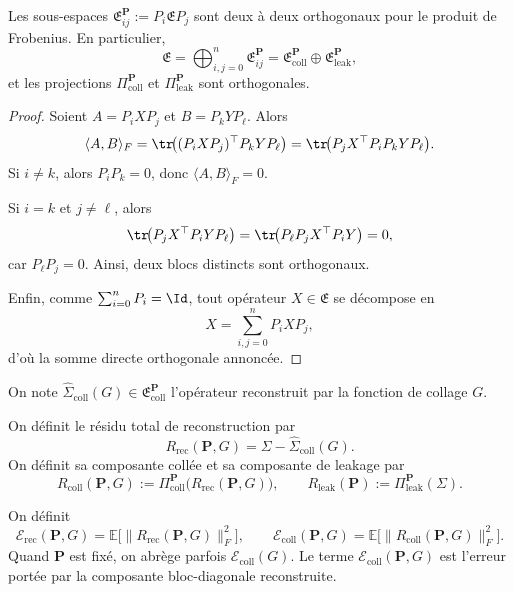 \begin{lemma}
Les sous-espaces \(\mathfrak E_{ij}^{\mathbf P}:=P_i\mathfrak E P_j\) sont deux à deux orthogonaux pour le produit de Frobenius.
En particulier,
\[
\mathfrak E
=
\bigoplus_{i,j=0}^n \mathfrak E_{ij}^{\mathbf P}
=
\mathfrak E_{\mathrm{coll}}^{\mathbf P}\oplus \mathfrak E_{\mathrm{leak}}^{\mathbf P},
\]
et les projections \(\Pi_{\mathrm{coll}}^{\mathbf P}\) et \(\Pi_{\mathrm{leak}}^{\mathbf P}\) sont orthogonales.
\end{lemma}

\begin{proof}
Soient \(A=P_iXP_j\) et \(B=P_kYP_\ell\). Alors
\[
\langle A,B\rangle_F
=
\tr\!\bigl((P_iXP_j)^\top P_kYP_\ell\bigr)
=
\tr\!\bigl(P_jX^\top P_iP_kYP_\ell\bigr).
\]
Si \(i\neq k\), alors \(P_iP_k=0\), donc \(\langle A,B\rangle_F=0\).

Si \(i=k\) et \(j\neq \ell\), alors
\[
\tr\!\bigl(P_jX^\top P_iYP_\ell\bigr)
=
\tr\!\bigl(P_\ell P_jX^\top P_iY\bigr)=0,
\]
car \(P_\ell P_j=0\). Ainsi, deux blocs distincts sont orthogonaux.

Enfin, comme \(\sum_{i=0}^n P_i=\Id\), tout opérateur \(X\in\mathfrak E\) se décompose en
\[
X=\sum_{i,j=0}^n P_iXP_j,
\]
d'où la somme directe orthogonale annoncée.
\end{proof}

\begin{definition}
On note \(\widehat \Sigma_{\mathrm{coll}}(G)\in\mathfrak E_{\mathrm{coll}}^{\mathbf P}\) l'opérateur reconstruit par la fonction de collage \(G\).

On définit le résidu total de reconstruction par
\[
R_{\mathrm{rec}}(\mathbf P,G)
=
\Sigma-\widehat \Sigma_{\mathrm{coll}}(G).
\]
On définit sa composante collée et sa composante de leakage par
\[
R_{\mathrm{coll}}(\mathbf P,G)
:=
\Pi_{\mathrm{coll}}^{\mathbf P}\!\bigl(R_{\mathrm{rec}}(\mathbf P,G)\bigr),
\qquad
R_{\mathrm{leak}}(\mathbf P)
:=
\Pi_{\mathrm{leak}}^{\mathbf P}(\Sigma).
\]
\end{definition}

\begin{definition}
On définit
\[
\mathcal E_{\mathrm{rec}}(\mathbf P,G)
=
\mathbb E\bigl[\|R_{\mathrm{rec}}(\mathbf P,G)\|_F^2\bigr],
\qquad
\mathcal E_{\mathrm{coll}}(\mathbf P,G)
=
\mathbb E\bigl[\|R_{\mathrm{coll}}(\mathbf P,G)\|_F^2\bigr].
\]
Quand \(\mathbf P\) est fixé, on abrège parfois \(\mathcal E_{\mathrm{coll}}(G)\).
Le terme \(\mathcal E_{\mathrm{coll}}(\mathbf P,G)\) est l'erreur portée par la composante bloc-diagonale reconstruite.
\end{definition}





